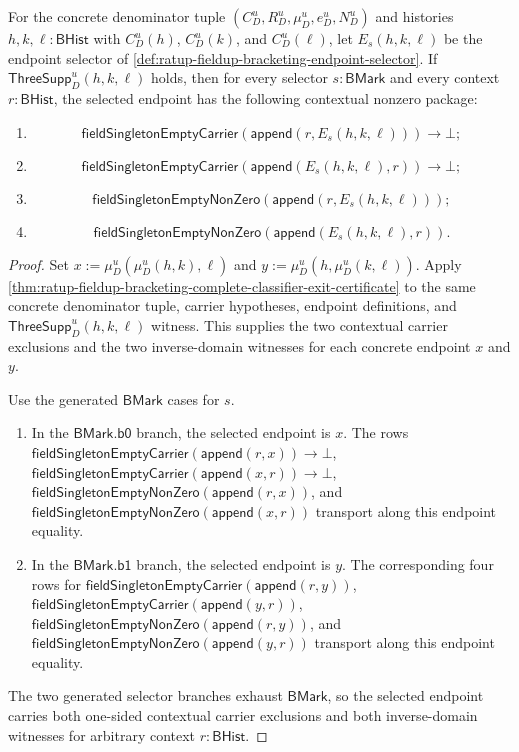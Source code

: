 \begin{theorem}
\label{thm:ratup-fieldup-selector-contextual-nonzero-package}
For the concrete denominator tuple $(C_D^u,R_D^u,\mu_D^u,e_D^u,N_D^u)$ and
histories $h,k,\ell:\mathsf{BHist}$ with $C_D^u(h)$, $C_D^u(k)$, and
$C_D^u(\ell)$, let $E_s(h,k,\ell)$ be the endpoint selector of
\autoref{def:ratup-fieldup-bracketing-endpoint-selector}. If
$\mathsf{ThreeSupp}_D^u(h,k,\ell)$ holds, then for every selector
$s:\mathsf{BMark}$ and every context $r:\mathsf{BHist}$, the selected endpoint
has the following contextual nonzero package:
\begin{enumerate}
  \item
  $$
  \mathsf{fieldSingletonEmptyCarrier}(\mathsf{append}(r,E_s(h,k,\ell)))\to\bot;
  $$
  \item
  $$
  \mathsf{fieldSingletonEmptyCarrier}(\mathsf{append}(E_s(h,k,\ell),r))\to\bot;
  $$
  \item
  $$
  \mathsf{fieldSingletonEmptyNonZero}(\mathsf{append}(r,E_s(h,k,\ell)));
  $$
  \item
  $$
  \mathsf{fieldSingletonEmptyNonZero}(\mathsf{append}(E_s(h,k,\ell),r)).
  $$
\end{enumerate}
\end{theorem}
\begin{proof}
Set $x:=\mu_D^u(\mu_D^u(h,k),\ell)$ and
$y:=\mu_D^u(h,\mu_D^u(k,\ell))$. Apply
\autoref{thm:ratup-fieldup-bracketing-complete-classifier-exit-certificate}
to the same concrete denominator tuple, carrier hypotheses, endpoint
definitions, and $\mathsf{ThreeSupp}_D^u(h,k,\ell)$ witness. This supplies the
two contextual carrier exclusions and the two inverse-domain witnesses for
each concrete endpoint $x$ and $y$.

Use the generated $\mathsf{BMark}$ cases for $s$.

\begin{enumerate}
  \item In the $\mathsf{BMark.b0}$ branch, the selected endpoint is $x$. The
  rows
  $\mathsf{fieldSingletonEmptyCarrier}(\mathsf{append}(r,x))\to\bot$,
  $\mathsf{fieldSingletonEmptyCarrier}(\mathsf{append}(x,r))\to\bot$,
  $\mathsf{fieldSingletonEmptyNonZero}(\mathsf{append}(r,x))$, and
  $\mathsf{fieldSingletonEmptyNonZero}(\mathsf{append}(x,r))$ transport along
  this endpoint equality.

  \item In the $\mathsf{BMark.b1}$ branch, the selected endpoint is $y$. The
  corresponding four rows for
  $\mathsf{fieldSingletonEmptyCarrier}(\mathsf{append}(r,y))$,
  $\mathsf{fieldSingletonEmptyCarrier}(\mathsf{append}(y,r))$,
  $\mathsf{fieldSingletonEmptyNonZero}(\mathsf{append}(r,y))$, and
  $\mathsf{fieldSingletonEmptyNonZero}(\mathsf{append}(y,r))$ transport along
  this endpoint equality.
\end{enumerate}

The two generated selector branches exhaust $\mathsf{BMark}$, so the selected
endpoint carries both one-sided contextual carrier exclusions and both
inverse-domain witnesses for arbitrary context $r:\mathsf{BHist}$.
\end{proof}
